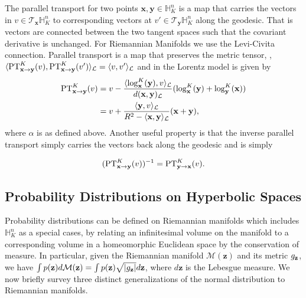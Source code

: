 The parallel transport for two points $\textbf{x},\textbf{y} \in \mathbb{H}^{n}_K$ is a map that carries the vectors in $v \in \mathcal{T}_{\textbf{x}}\mathbb{H}^{n}_K$ to corresponding vectors at $v' \in \mathcal{T}_{\textbf{y}}\mathbb{H}^{n}_K$ along the geodesic. That is vectors are connected between the two tangent spaces such that the covariant derivative is unchanged. For Riemannian Manifolds we use the Levi-Civita connection. Parallel transport is a map that preserves the metric tensor, \ie, $\langle \textnormal{PT}^K_{\textbf{x} \to \textbf{y}}(v), \textnormal{PT}^K_{\textbf{x} \to \textbf{y}}(v') \rangle_{\mathcal{L}} = \langle v, v' \rangle_{\mathcal{L}}$ and in the Lorentz model is given by
\begin{align}
    \textnormal{PT}^K_{\textbf{x} \to \textbf{y}}(v) & = v - \frac{ \langle \log^K_{\textbf{x}}(\textbf{y}), v \rangle_{\mathcal{L}}}{d(\textbf{x},\textbf{y})_{\mathcal{L}}} (\log^K_{\textbf{x}}(\textbf{y})+ \log^K_{\textbf{y}}(\textbf{x})) \nonumber \\
    & = v + \frac{ \langle \textbf{y}, v \rangle_{\mathcal{L}}}{R^2 - \langle \textbf{x}, \textbf{y} \rangle_{\mathcal{L}}} (\textbf{x}+ \textbf{y}),
\end{align}
where $\alpha$ is as defined above. Another useful property is that the inverse parallel transport simply carries the vectors back along the geodesic and is simply

\begin{equation}
      (\textnormal{PT}^{K}_{\textbf{x} \to \textbf{y}}(v))^{-1} = \textnormal{PT}^K_{\textbf{y} \to \textbf{x}}(v).
\end{equation}

\subsection{Probability Distributions on Hyperbolic Spaces}

Probability distributions can be defined on Riemannian manifolds which includes $\mathbb{H}^n_K$ as a special cases, by relating an infinitesimal volume on the manifold to a corresponding volume in a homeomorphic Euclidean space by the conservation of measure.
In particular, given the Riemannian manifold $\mathcal{M}(\textbf{z})$ and its metric $g_{\mathbf{z}}$, we have $\int p(\textbf{z}) d\mathcal{M} (\textbf{z}) = \int p(\textbf{z})\sqrt{|g_{\mathbf{z}}|}d \textbf{z}$, where $d \textbf{z}$ is the Lebesgue measure. We now briefly survey three distinct generalizations of the normal distribution to Riemannian manifolds.

